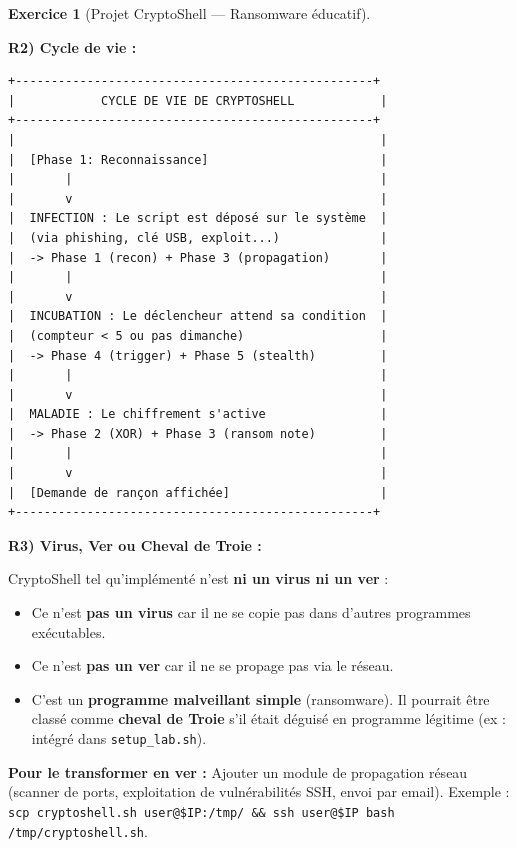 \documentclass[a4paper,11pt]{article}
\theoremstyle{plain}
\theoremstyle{definition}
\newtheorem{exercice}{Exercice}
\begin{document}
\begin{exercice}[Projet CryptoShell --- Ransomware éducatif]
\begin{correction}
\medskip
\textbf{R2) Cycle de vie :}
\begin{lstlisting}[numbers=none,frame=none,backgroundcolor=\color{white},language={}]
+--------------------------------------------------+
|            CYCLE DE VIE DE CRYPTOSHELL            |
+--------------------------------------------------+
|                                                   |
|  [Phase 1: Reconnaissance]                        |
|       |                                           |
|       v                                           |
|  INFECTION : Le script est déposé sur le système  |
|  (via phishing, clé USB, exploit...)              |
|  -> Phase 1 (recon) + Phase 3 (propagation)       |
|       |                                           |
|       v                                           |
|  INCUBATION : Le déclencheur attend sa condition  |
|  (compteur < 5 ou pas dimanche)                   |
|  -> Phase 4 (trigger) + Phase 5 (stealth)         |
|       |                                           |
|       v                                           |
|  MALADIE : Le chiffrement s'active                |
|  -> Phase 2 (XOR) + Phase 3 (ransom note)         |
|       |                                           |
|       v                                           |
|  [Demande de rançon affichée]                     |
+--------------------------------------------------+
\end{lstlisting}

\medskip
\textbf{R3) Virus, Ver ou Cheval de Troie :}

CryptoShell tel qu'implémenté n'est \textbf{ni un virus ni un ver} :
\begin{itemize}
    \item Ce n'est \textbf{pas un virus} car il ne se copie pas dans d'autres programmes exécutables.
    \item Ce n'est \textbf{pas un ver} car il ne se propage pas via le réseau.
    \item C'est un \textbf{programme malveillant simple} (ransomware). Il pourrait être classé comme \textbf{cheval de Troie} s'il était déguisé en programme légitime (ex : intégré dans \texttt{setup\_lab.sh}).
\end{itemize}

\textbf{Pour le transformer en ver :} Ajouter un module de propagation réseau (scanner de ports, exploitation de vulnérabilités SSH, envoi par email). Exemple : \texttt{scp cryptoshell.sh user@\$IP:/tmp/ \&\& ssh user@\$IP bash /tmp/cryptoshell.sh}.


\end{correction}
\end{exercice}
\end{document}
